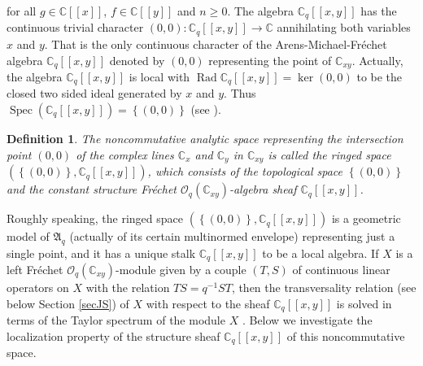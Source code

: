 \documentclass[12pt,reqno]{amsart}%
\theoremstyle{plain}
\newtheorem{definition}{Definition}
\numberwithin{theorem}{section} \numberwithin{equation}{section}
\numberwithin{lemma}{section}
\numberwithin{remark}{section}
\numberwithin{example}{section}
\numberwithin{proposition}{section}
\numberwithin{definition}{section}
\numberwithin{corollary}{section}
\begin{document}
for all $g\in\mathbb{C}\left[  \left[  x\right]  \right]  $, $f\in
\mathbb{C}\left[  \left[  y\right]  \right]  $ and $n\geq0$. The algebra
$\mathbb{C}_{q}\left[  \left[  x,y\right]  \right]  $ has the continuous
trivial character $\left(  0,0\right)  :\mathbb{C}_{q}\left[  \left[
x,y\right]  \right]  \rightarrow\mathbb{C}$ annihilating both variables $x$
and $y$. That is the only continuous character of the
Arens-Michael-Fr\'{e}chet algebra $\mathbb{C}_{q}\left[  \left[  x,y\right]
\right]  $ denoted by $\left(  0,0\right)  $ representing the point of
$\mathbb{C}_{xy}$. Actually, the algebra $\mathbb{C}_{q}\left[  \left[
x,y\right]  \right]  $ is local with $\operatorname{Rad}\mathbb{C}_{q}\left[
\left[  x,y\right]  \right]  =\ker\left(  0,0\right)  $ to be the closed two
sided ideal generated by $x$ and $y$. Thus $\operatorname{Spec}\left(
\mathbb{C}_{q}\left[  \left[  x,y\right]  \right]  \right)  =\left\{  \left(
0,0\right)  \right\}  $ (see \cite[Lemma 5.1]{Dosi25}).

\begin{definition}
\label{def1}The noncommutative analytic space representing the intersection
point $\left(  0,0\right)  $ of the complex lines $\mathbb{C}_{x}$ and
$\mathbb{C}_{y}$ in $\mathbb{C}_{xy}$ is called the ringed space $\left(
\left\{  \left(  0,0\right)  \right\}  ,\mathbb{C}_{q}\left[  \left[
x,y\right]  \right]  \right)  $, which consists of the topological space
$\left\{  \left(  0,0\right)  \right\}  $ and the constant structure
Fr\'{e}chet $\mathcal{O}_{q}\left(  \mathbb{C}_{xy}\right)  $-algebra sheaf
$\mathbb{C}_{q}\left[  \left[  x,y\right]  \right]  $.
\end{definition}

Roughly speaking, the ringed space $\left(  \left\{  \left(  0,0\right)
\right\}  ,\mathbb{C}_{q}\left[  \left[  x,y\right]  \right]  \right)  $ is a
geometric model of $\mathfrak{A}_{q}$ (actually of its certain multinormed
envelope) representing just a single point, and it has a unique stalk
$\mathbb{C}_{q}\left[  \left[  x,y\right]  \right]  $ to be a local algebra.
If $X$ is a left Fr\'{e}chet $\mathcal{O}_{q}\left(  \mathbb{C}_{xy}\right)
$-module given by a couple $\left(  T,S\right)  $ of continuous linear
operators on $X$ with the relation $TS=q^{-1}ST$, then the transversality
relation (see below Section \ref{secJS}) of $X$ with respect to the sheaf
$\mathbb{C}_{q}\left[  \left[  x,y\right]  \right]  $ is solved in terms of
the Taylor spectrum of the module $X$ \cite[Proposition 6.4]{Dosi25}. Below we
investigate the localization property of the structure sheaf $\mathbb{C}%
_{q}\left[  \left[  x,y\right]  \right]  $ of this noncommutative space.
\end{document}
